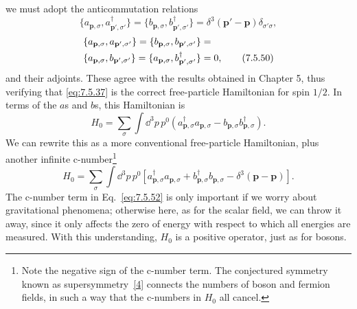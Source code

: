 
we must adopt the anticommutation relations
\begin{equation}
\{a_{\mathbf p,\sigma},a^\dagger_{\mathbf p',\sigma'}\}
=\{b_{\mathbf p,\sigma},b^\dagger_{\mathbf p',\sigma'}\}
=\delta^3(\mathbf p'-\mathbf p)\delta_{\sigma'\sigma},
\tag{7.5.49}\label{eq:7.5.49}
\end{equation}
\begin{align}
\{a_{\mathbf p,\sigma},a_{\mathbf p',\sigma'}\}
=\{b_{\mathbf p,\sigma},b_{\mathbf p',\sigma'}\}
&={}\notag\\
\{a_{\mathbf p,\sigma},b_{\mathbf p',\sigma'}\}
=\{a_{\mathbf p,\sigma},b^\dagger_{\mathbf p',\sigma'}\}&=0,
\tag{7.5.50}\label{eq:7.5.50}
\end{align}
and their adjoints. These agree with the results obtained in Chapter 5, thus
verifying that \eqref{eq:7.5.37} is the correct free-particle Hamiltonian for spin
$1/2$. In terms of the $a$s and $b$s, this Hamiltonian is
\begin{equation}
H_0=\sum_\sigma\int \dd^3p\,p^0
\left(a^\dagger_{\mathbf p,\sigma}a_{\mathbf p,\sigma}
-b_{\mathbf p,\sigma}b^\dagger_{\mathbf p,\sigma}\right).
\tag{7.5.51}\label{eq:7.5.51}
\end{equation}
We can rewrite this as a more conventional free-particle Hamiltonian, plus
another infinite c-number\footnote{Note the negative sign of the c-number
term. The conjectured symmetry known as supersymmetry~\hyperref[ref:7.4]{[4]} connects the numbers
of boson and fermion fields, in such a way that the c-numbers in $H_0$ all
cancel.}
\begin{equation}
H_0=\sum_\sigma\int \dd^3p\,p^0\left[
a^\dagger_{\mathbf p,\sigma}a_{\mathbf p,\sigma}
+b^\dagger_{\mathbf p,\sigma}b_{\mathbf p,\sigma}
-\delta^3(\mathbf p-\mathbf p)\right].
\tag{7.5.52}\label{eq:7.5.52}
\end{equation}
The c-number term in Eq.~\eqref{eq:7.5.52} is only important if we worry about
gravitational phenomena; otherwise here, as for the scalar field, we can
throw it away, since it only affects the zero of energy with respect to which
all energies are measured. With this understanding, $H_0$ is a positive
operator, just as for bosons.


